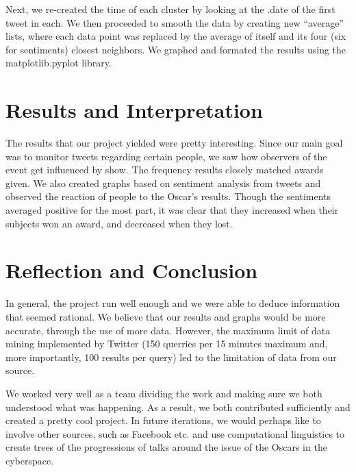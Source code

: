 \documentclass[11pt]{article}
\begin{document}
Next, we re-created the time of each cluster by looking at the .date of the first tweet in each. We then proceeded to smooth the data by creating new “average” lists, where each data point was replaced 
by the average of itself and its four (six for sentiments) closest neighbors. We graphed and formated the results using the matplotlib.pyplot library.

\section{Results and Interpretation}

The results that our project yielded were pretty interesting. Since our main goal was to monitor tweets regarding certain people, we saw how observers of the event get influenced by show. The frequency results closely matched awards given. We also created graphs based on sentiment analysis from tweets and observed the reaction of people to the Oscar's results. Though the sentiments averaged positive for the most part, it was clear that they increased when their subjects won an award, and decreased when they lost.

\section{Reflection and Conclusion}
In general, the project run well enough and we were able to deduce information that seemed rational. We believe that our results and graphs would be more accurate, through the use of more data. However, the maximum limit of data mining implemented by Twitter (150 querries per 15 minutes maximum and, more importantly, 100 results per query) led to the limitation of data from our source.

We worked very well as a team dividing the work and making sure we both understood what was happening. As a result, we both contributed sufficiently and created a pretty cool project. In future iterations, we would perhaps like to involve other sources, such as Facebook etc. and use computational linguistics to create trees of the progressions of talks around the issue of the Oscars in the cyberspace.
\end{document}
